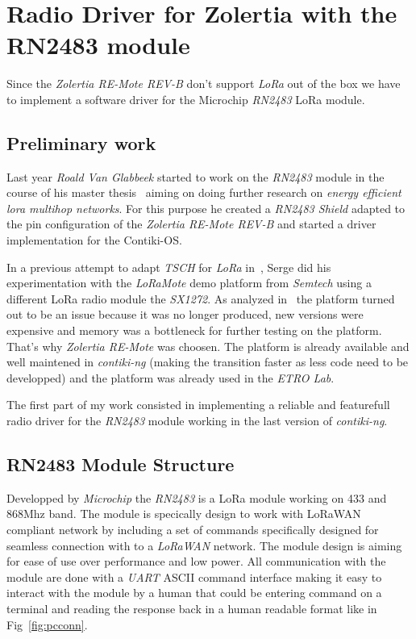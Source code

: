 \chapter{Radio Driver for Zolertia with the RN2483 module}


Since the \emph{Zolertia RE-Mote REV-B} don't support \emph{LoRa} out of the
box we have to implement a software driver for the Microchip \emph{RN2483} LoRa
module.

\section{Preliminary work}

Last year \emph{Roald Van Glabbeek} started to work on the \emph{RN2483} module
in the course of his master thesis~\cite{8847137} aiming on doing further
research on \emph{energy efficient lora multihop networks}.
For this purpose he created a \emph{RN2483 Shield} adapted to the pin
configuration of the \emph{Zolertia RE-Mote REV-B} and started a driver
implementation for the Contiki-OS\@.

In a previous attempt to adapt \emph{TSCH} for \emph{LoRa}
in~\cite{njomgang_2018}, Serge did his experimentation with the \emph{LoRaMote}
demo platform from \emph{Semtech} using a different LoRa radio module the
\emph{SX1272}. 
As analyzed in~\cite{8847137} the platform turned out to be an
issue because it was no longer produced, new versions were expensive and memory
was a bottleneck for further testing on the platform.
That's why \emph{Zolertia RE-Mote} was choosen. The platform is already available 
and well maintened in \emph{contiki-ng} (making the transition faster as less
code need to be developped) and the platform was already used in the \emph{ETRO Lab}.

The first part of my work consisted in implementing a reliable
and featurefull radio driver for the \emph{RN2483} module working in the last
version of \emph{contiki-ng}.

\section{RN2483 Module Structure}

Developped by \emph{Microchip} the \emph{RN2483} is a LoRa module working on
433 and 868Mhz band. The module is specically design to work with LoRaWAN
compliant network by including a set of commands specifically designed for
seamless connection with to a \emph{LoRaWAN} network. The module design is
aiming for ease of use over performance and low power.
All communication with the module are done with a \emph{UART} ASCII command
interface making it easy to interact with the module by a human that could be
entering command on a terminal and reading the response back in a human
readable format like in Fig~\ref{fig:pcconn}.

